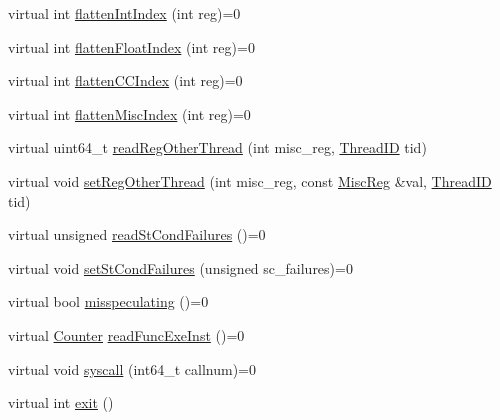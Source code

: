 \begin{DoxyCompactItemize}
\item 
virtual int \hyperlink{classThreadContext_a6940c379416884cb0b9eb04c5193580e}{flattenIntIndex} (int reg)=0
\item 
virtual int \hyperlink{classThreadContext_a7176627444d21b2734a0855b67e6aacf}{flattenFloatIndex} (int reg)=0
\item 
virtual int \hyperlink{classThreadContext_aedffeaa2c4a155d5916a2ae379d77a51}{flattenCCIndex} (int reg)=0
\item 
virtual int \hyperlink{classThreadContext_a8014f007a20a06d35f8b13adc3a05816}{flattenMiscIndex} (int reg)=0
\item 
virtual uint64\_\-t \hyperlink{classThreadContext_afcd73144c45c9fd2f36d55ea4c491505}{readRegOtherThread} (int misc\_\-reg, \hyperlink{base_2types_8hh_ab39b1a4f9dad884694c7a74ed69e6a6b}{ThreadID} tid)
\item 
virtual void \hyperlink{classThreadContext_a20daffa344b5c94c4bb2b5f8973a72d1}{setRegOtherThread} (int misc\_\-reg, const \hyperlink{classThreadContext_aaf5f073a387db0556d1db4bcc45428bc}{MiscReg} \&val, \hyperlink{base_2types_8hh_ab39b1a4f9dad884694c7a74ed69e6a6b}{ThreadID} tid)
\item 
virtual unsigned \hyperlink{classThreadContext_ab1bc64ec54c1cc47c9945fe68fa9e91c}{readStCondFailures} ()=0
\item 
virtual void \hyperlink{classThreadContext_aaa3506321089a0ec9c36d9ceff17c346}{setStCondFailures} (unsigned sc\_\-failures)=0
\item 
virtual bool \hyperlink{classThreadContext_a6b21c2b589ae3065643986e1c3e5f6fa}{misspeculating} ()=0
\item 
virtual \hyperlink{base_2types_8hh_ae1475755791765b8e6f6a8bb091e273e}{Counter} \hyperlink{classThreadContext_ae9aa32b63846c7bae5f2b6d899bdbf9c}{readFuncExeInst} ()=0
\item 
virtual void \hyperlink{classThreadContext_ae5fdd7da5d82e981c65cbd6115dcfe60}{syscall} (int64\_\-t callnum)=0
\item 
virtual int \hyperlink{classThreadContext_ac4ce3a35ac3fb01bbe84ecb0d8d19677}{exit} ()
\end{DoxyCompactItemize}
